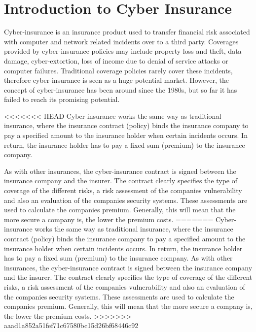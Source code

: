 \chapter{Introduction to Cyber Insurance}
\label{chp:introductionToCyberInsurance} 

Cyber-insurance is an insurance product used to transfer financial risk
associated with computer and network related incidents over to a third party.
 Coverages provided by cyber-insurance policies may include property loss and
theft, data damage, cyber-extortion, loss of income due to denial of service attacks or computer failures. \cite{washingtonpaper}
Traditional coverage policies rarely cover these incidents, therefore cyber-insurance is seen as a huge potential market. However, the concept of cyber-insurance has been around since the 1980s, but so far it has failed to reach its promising potential. 
  
 
<<<<<<< HEAD
Cyber-insurance works the same way as traditional insurance, where the insurance contract (policy) binds the insurance company to pay a specified amount to the insurance holder when certain incidents occurs. In return, the insurance holder has to pay a fixed sum (premium) to the insurance company. \cite{robinson2012incentives}

    As with other insurances, the cyber-insurance contract is signed between the insurance company and the insurer. The contract clearly specifies the type of coverage of the different risks, a risk assessment of the companies vulnerability and also an evaluation of the companies security systems. These assessments are used to calculate the companies premium. \cite{robinson2012incentives} Generally, this will mean that the more secure a company is, the lower the premium costs.  
=======
Cyber-insurance works the same way as traditional insurance, where the insurance contract (policy)
 binds the insurance company to pay a specified amount to the insurance holder when certain incidents
  occurs. In return, the insurance holder has to pay a fixed sum (premium) to the insurance company.
   \cite{robinson2012incentives}
    As with other insurances, the cyber-insurance contract is signed between the insurance company and
     the insurer. The contract clearly specifies the type of coverage of the different risks, a risk
      assessment of the companies vulnerability and also an evaluation of the companies security
       systems. These assessments are used to calculate the companies premium.
 \cite{robinson2012incentives} Generally, this will mean that the more secure a company is, the lower the premium costs.  
>>>>>>> aaad1a852a51fef71c67580bc15d26bf68446c92


